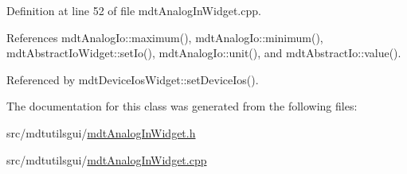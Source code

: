 Definition at line 52 of file mdt\-Analog\-In\-Widget.\-cpp.



References mdt\-Analog\-Io\-::maximum(), mdt\-Analog\-Io\-::minimum(), mdt\-Abstract\-Io\-Widget\-::set\-Io(), mdt\-Analog\-Io\-::unit(), and mdt\-Abstract\-Io\-::value().



Referenced by mdt\-Device\-Ios\-Widget\-::set\-Device\-Ios().



The documentation for this class was generated from the following files\-:\begin{DoxyCompactItemize}
\item 
src/mdtutilsgui/\hyperlink{mdt_analog_in_widget_8h}{mdt\-Analog\-In\-Widget.\-h}\item 
src/mdtutilsgui/\hyperlink{mdt_analog_in_widget_8cpp}{mdt\-Analog\-In\-Widget.\-cpp}\end{DoxyCompactItemize}
